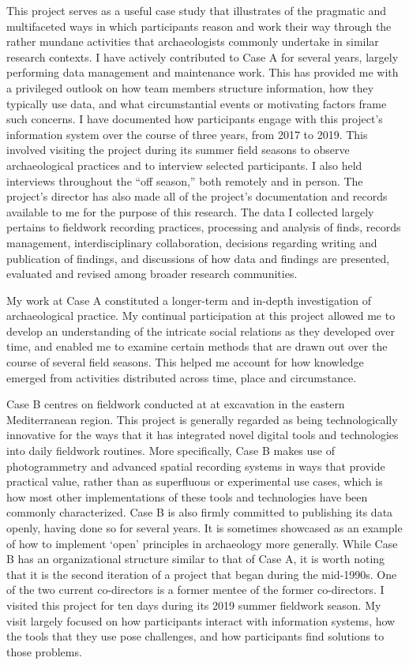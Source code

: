 \documentclass[
]{article}
\begin{document}
This project serves as a useful case study that illustrates of the
pragmatic and multifaceted ways in which participants reason and work
their way through the rather mundane activities that archaeologists
commonly undertake in similar research contexts. I have actively
contributed to Case A for several years, largely performing data
management and maintenance work. This has provided me with a privileged
outlook on how team members structure information, how they typically
use data, and what circumstantial events or motivating factors frame
such concerns. I have documented how participants engage with this
project's information system over the course of three years, from 2017
to 2019. This involved visiting the project during its summer field
seasons to observe archaeological practices and to interview selected
participants. I also held interviews throughout the ``off season,'' both
remotely and in person. The project's director has also made all of the
project's documentation and records available to me for the purpose of
this research. The data I collected largely pertains to fieldwork
recording practices, processing and analysis of finds, records
management, interdisciplinary collaboration, decisions regarding writing
and publication of findings, and discussions of how data and findings
are presented, evaluated and revised among broader research communities.

My work at Case A constituted a longer-term and in-depth investigation
of archaeological practice. My continual participation at this project
allowed me to develop an understanding of the intricate social relations
as they developed over time, and enabled me to examine certain methods
that are drawn out over the course of several field seasons. This helped
me account for how knowledge emerged from activities distributed across
time, place and circumstance.

Case B centres on fieldwork conducted at at excavation in the eastern
Mediterranean region. This project is generally regarded as being
technologically innovative for the ways that it has integrated novel
digital tools and technologies into daily fieldwork routines. More
specifically, Case B makes use of photogrammetry and advanced spatial
recording systems in ways that provide practical value, rather than as
superfluous or experimental use cases, which is how most other
implementations of these tools and technologies have been commonly
characterized. Case B is also firmly committed to publishing its data
openly, having done so for several years. It is sometimes showcased as
an example of how to implement `open' principles in archaeology more
generally. While Case B has an organizational structure similar to that
of Case A, it is worth noting that it is the second iteration of a
project that began during the mid-1990s. One of the two current
co-directors is a former mentee of the former co-directors. I visited
this project for ten days during its 2019 summer fieldwork season. My
visit largely focused on how participants interact with information
systems, how the tools that they use pose challenges, and how
participants find solutions to those problems.
\end{document}
